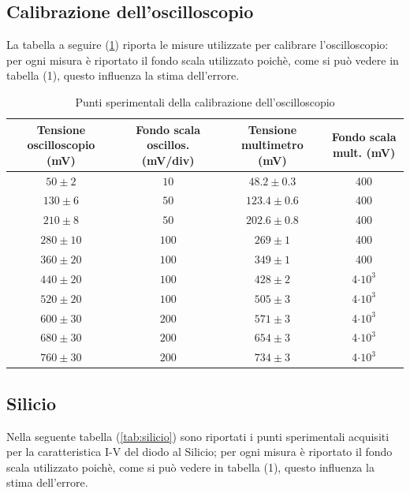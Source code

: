 \documentclass[]{article}
\begin{document}
\subsection{Calibrazione dell'oscilloscopio}
La tabella a seguire (\ref{tab:calibrazione}) riporta le misure utilizzate per calibrare l'oscilloscopio: per ogni misura è riportato il fondo scala utilizzato poichè, come si può vedere in tabella (1), questo influenza la stima dell'errore. 
	\begin{table}[H]
		\centering
	\begin{tabular}{|c|c|c|c|}
		\hline
		Tensione oscilloscopio (mV)& Fondo scala oscillos. (mV/div) & Tensione multimetro (mV) & Fondo scala mult. (mV) \\
		\hline
		$ 50\pm 2 $ &$ 10 $ & $ 48.2\pm 0.3 $ &400\\
		\hline
		$ 130\pm 6$ &$ 50 $ & $ 123.4\pm 0.6 $ &400\\
		\hline
		$ 210\pm 8 $ &$ 50 $ & $ 202.6\pm 0.8 $ &400\\
		\hline
		$ 280\pm 10$ &$ 100 $ & $ 269\pm 1 $ &400\\
		\hline
		$ 360\pm 20 $ &$ 100 $ & $ 349\pm 1 $ &400\\
		\hline
		$ 440\pm 20 $ &$ 100 $ & $ 428\pm 2 $ &4$\cdot10^3$\\
		\hline
		$ 520\pm 20 $ &$ 100 $ & $ 505\pm 3 $ &4$\cdot10^3$\\
		\hline
		$ 600\pm 30 $ &$ 200 $ & $ 571\pm 3 $ &4$\cdot10^3$\\
		\hline
		$ 680\pm 30 $ &$ 200 $ & $ 654\pm 3 $&4$\cdot10^3$ \\
		\hline
		$ 760\pm 30 $ &$ 200 $ & $ 734\pm 3 $&4$\cdot10^3$ \\
		\hline
		
	\end{tabular}
\caption{Punti sperimentali della calibrazione dell'oscilloscopio}
\label{tab:calibrazione}
\end{table}
\subsection{Silicio}
Nella seguente tabella (\ref{tab:silicio}) sono riportati i punti sperimentali acquisiti per la caratteristica I-V del diodo al Silicio; per ogni misura è riportato il fondo scala utilizzato poichè, come si può vedere in tabella (1), questo influenza la stima dell'errore.
\end{document}
